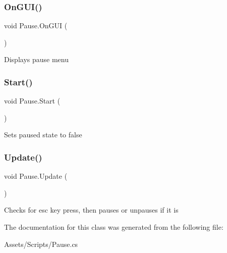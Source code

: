\subsubsection{\texorpdfstring{On\+G\+U\+I()}{OnGUI()}}
{\footnotesize\ttfamily void Pause.\+On\+G\+UI (\begin{DoxyParamCaption}{ }\end{DoxyParamCaption})\hspace{0.3cm}{\ttfamily [inline]}}

Displays pause menu \mbox{\label{class_pause_a2676d511f741a690dd8a1d6f64aef89c}} 
\subsubsection{\texorpdfstring{Start()}{Start()}}
{\footnotesize\ttfamily void Pause.\+Start (\begin{DoxyParamCaption}{ }\end{DoxyParamCaption})\hspace{0.3cm}{\ttfamily [inline]}}

Sets paused state to false \mbox{\label{class_pause_aab062f8945cc0bad08b554ad58357dc5}} 
\subsubsection{\texorpdfstring{Update()}{Update()}}
{\footnotesize\ttfamily void Pause.\+Update (\begin{DoxyParamCaption}{ }\end{DoxyParamCaption})\hspace{0.3cm}{\ttfamily [inline]}}

Checks for esc key press, then pauses or unpauses if it is 

The documentation for this class was generated from the following file\+:\begin{DoxyCompactItemize}
\item 
Assets/\+Scripts/Pause.\+cs\end{DoxyCompactItemize}

